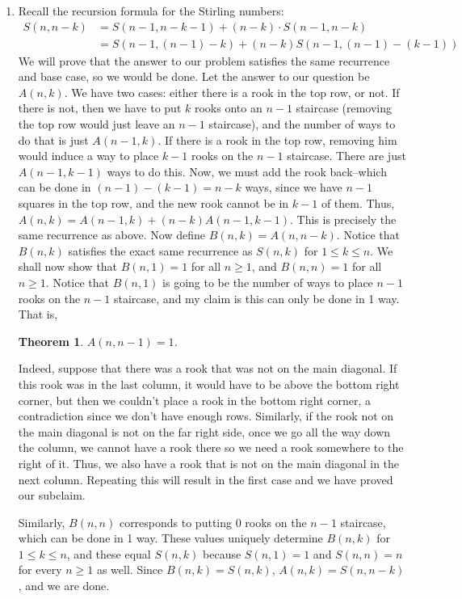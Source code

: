 \documentclass[12pt]{article}
\newtheorem{theorem}{Theorem}[section]
\theoremstyle{definition}
\theoremstyle{remark}
\begin{document}
\begin{enumerate}[leftmargin=\labelsep]
		\item Recall the recursion formula for the Stirling numbers:
		\begin{align*}
			S(n, n-k) &= S(n-1, n-k-1) + (n-k) \cdot S(n-1, n-k) 
			\\&= S(n-1, (n-1)-k) + (n-k)S(n-1, (n-1)-(k-1))
		\end{align*} 
		We will prove that the answer to our problem satisfies the same recurrence and base case, so we would be done. Let the answer to our question be $A(n, k)$. We have two cases: either there is a rook in the top row, or not. If there is not, then we have to put $k$ rooks onto an $n-1$ staircase (removing the top row would just leave an $n-1$ staircase), and the number of ways to do that is just $A(n-1, k)$. If there is a rook in the top row, removing him would induce a way to place $k-1$ rooks on the $n-1$ staircase. There are just $A(n-1, k-1)$ ways to do this. Now, we must add the rook back--which can be done in $(n-1)-(k-1) = n-k$ ways, since we have $n-1$ squares in the top row, and the new rook cannot be in $k-1$ of them. Thus, $A(n, k) = A(n-1, k) + (n-k)A(n-1,k-1)$. This is precisely the same recurrence as above. Now define $B(n,k) = A(n, n-k)$. Notice that $B(n,k)$ satisfies the exact same recurrence as $S(n,k)$ for $1 \leq k \leq n$. We shall now show that $B(n, 1) = 1$ for all $n \geq 1$, and $B(n, n) = 1$ for all $n \geq 1$. Notice that $B(n, 1)$ is going to be the number of ways to place $n-1$ rooks on the $n-1$ staircase, and my claim is this can only be done in 1 way. That is,
		
		\newpage
		\begin{theorem}
			$A(n, n-1) = 1$.
		\end{theorem}
		Indeed, suppose that there was a rook that was not on the main diagonal. If this rook was in the last column, it would have to be above the bottom right corner, but then we couldn't place a rook in the bottom right corner, a contradiction since we don't have enough rows. Similarly, if the rook not on the main diagonal is not on the far right side, once we go all the way down the column, we cannot have a rook there so we need a rook somewhere to the right of it. Thus, we also have a rook that is not on the main diagonal in the next column. Repeating this will result in the first case and we have proved our subclaim.
		
		
		
		
		 Similarly, $B(n, n)$ corresponds to putting 0 rooks on the $n-1$ staircase, which can be done in 1 way. These values uniquely determine $B(n,k)$ for $1 \leq k \leq n$, and these equal $S(n,k)$ because $S(n, 1) = 1$ and $S(n, n) = n$ for every $n \geq 1$ as well. Since $B(n,k) = S(n,k)$, $A(n,k) = S(n,n-k)$, and we are done.
	\end{enumerate}
\end{document}
